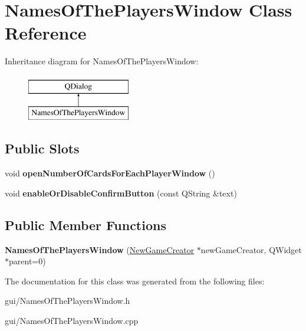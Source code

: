 \hypertarget{classNamesOfThePlayersWindow}{}\section{Names\+Of\+The\+Players\+Window Class Reference}
\label{classNamesOfThePlayersWindow}
Inheritance diagram for Names\+Of\+The\+Players\+Window\+:\begin{figure}[H]
\begin{center}
\leavevmode
\includegraphics[height=2.000000cm]{classNamesOfThePlayersWindow}
\end{center}
\end{figure}
\subsection*{Public Slots}
\begin{DoxyCompactItemize}
\item 
\mbox{\label{classNamesOfThePlayersWindow_aca0f8b0eb650053a75a0805fdc6a0012}} 
void {\bfseries open\+Number\+Of\+Cards\+For\+Each\+Player\+Window} ()
\item 
\mbox{\label{classNamesOfThePlayersWindow_ac52d684884838cb8f99a495b3c0f89d9}} 
void {\bfseries enable\+Or\+Disable\+Confirm\+Button} (const Q\+String \&text)
\end{DoxyCompactItemize}
\subsection*{Public Member Functions}
\begin{DoxyCompactItemize}
\item 
\mbox{\label{classNamesOfThePlayersWindow_a199b485baab3f42c072a33e845cd35cf}} 
{\bfseries Names\+Of\+The\+Players\+Window} (\hyperlink{classNewGameCreator}{New\+Game\+Creator} $\ast$new\+Game\+Creator, Q\+Widget $\ast$parent=0)
\end{DoxyCompactItemize}


The documentation for this class was generated from the following files\+:\begin{DoxyCompactItemize}
\item 
gui/Names\+Of\+The\+Players\+Window.\+h\item 
gui/Names\+Of\+The\+Players\+Window.\+cpp\end{DoxyCompactItemize}
